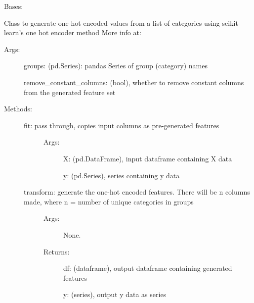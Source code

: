 \documentclass[letterpaper,10pt,english]{sphinxmanual}
\begin{document}
\begin{fulllineitems}
\label{\detokenize{api/mastml.feature_generators.OneHotGroupGenerator:mastml.feature_generators.OneHotGroupGenerator}}
Bases: {\hyperref[\detokenize{api/mastml.feature_generators.BaseGenerator:mastml.feature_generators.BaseGenerator}]{}}

Class to generate one-hot encoded values from a list of categories using scikit-learn’s one hot encoder method
More info at: 
\begin{description}
\item[{Args:}] \leavevmode
groups: (pd.Series): pandas Series of group (category) names

remove\_constant\_columns: (bool), whether to remove constant columns from the generated feature set

\item[{Methods:}] \leavevmode\begin{description}
\item[{fit: pass through, copies input columns as pre-generated features}] \leavevmode\begin{description}
\item[{Args:}] \leavevmode
X: (pd.DataFrame), input dataframe containing X data

y: (pd.Series), series containing y data

\end{description}

\item[{transform: generate the one-hot encoded features. There will be n columns made, where n = number of unique categories in groups}] \leavevmode\begin{description}
\item[{Args:}] \leavevmode
None.

\item[{Returns:}] \leavevmode
df: (dataframe), output dataframe containing generated features

y: (series), output y data as series

\end{description}


\end{description}
\end{description}
\end{fulllineitems}
\end{document}
